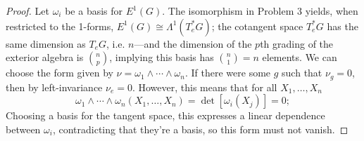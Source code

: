 \documentclass{article}
\begin{document}
\begin{proof}
  Let $\omega_{i}$ be a basis for $E^{1}(G)$.
  The isomorphism in Problem 3 yields, when restricted to the 1-forms, $E^{1}(G) \cong \Lambda^{1}(T_{e}^{*}G)$;
  the cotangent space $T_{e}^{*}G$ has the same dimension as $T_{e}G$, i.e. $n$---and
  the dimension of the $p$th grading of the exterior algebra is $\binom{n}{p}$, implying this basis has $\binom{n}{1} = n$ elements.
  We can choose the form given by $\nu = \omega_{1} \wedge \cdots \wedge \omega_{n}$.
  If there were some $g$ such that $\nu_{g} = 0$, then by left-invariance $\nu_{e} = 0$.
  However, this means that for all $X_{1}, \ldots, X_{n}$
  \[
    \omega_{1} \wedge \cdots \wedge \omega_{n}(X_{1}, \ldots, X_{n}) = \det[\omega_{i}(X_{j})] = 0;
  \]
  Choosing a basis for the tangent space, this expresses a linear dependence between $\omega_{i}$, contradicting that they're a basis,
  so this form must not vanish.
\end{proof}
\end{document}
